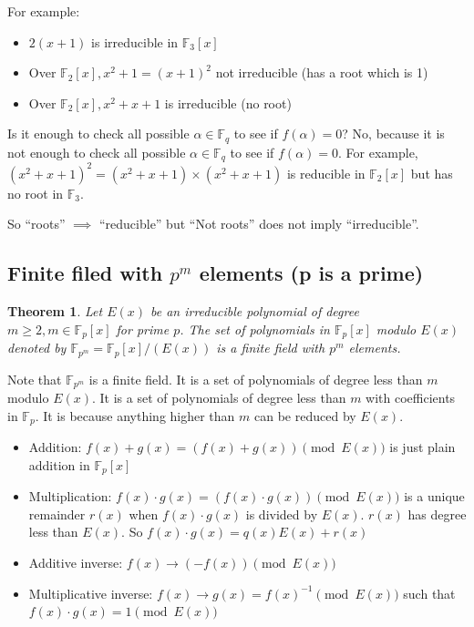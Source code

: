 \documentclass[letterpaper,12pt]{article}
\newtheorem{theorem}{Theorem}
\begin{document}
For example: \begin{itemize}
    \item $2(x+1)$ is irreducible in $\mathbb{F}_3[x]$
    \item Over $\mathbb{F}_2[x],x^2+1=(x+1)^2$ not irreducible (has a root which is 1)
    \item Over $\mathbb{F}_2[x], x^2+x+1$ is irreducible (no root)
\end{itemize}
Is it enough to check all possible $\alpha \in \mathbb{F}_q$ to see if $f(\alpha)=0$? No, because it is not enough to check all possible $\alpha \in \mathbb{F}_q$ to see if $f(\alpha)=0$. For example, $(x^2+x+1)^2 = (x^2+x+1)\times(x^2+x+1)$ is reducible in $\mathbb{F}_2[x]$ but has no root in $\mathbb{F}_3$.

So ``roots'' $\implies$ ``reducible'' but ``Not roots'' does not imply
``irreducible''.
\subsection{Finite filed with $p^m$ elements (p is a prime)}
\begin{theorem}
    Let $E(x)$ be an irreducible polynomial of degree $m\ge 2, m \in \mathbb{F}_p[x]$ for prime $p$. The set of polynomials in $\mathbb{F}_p[x]$ modulo $E(x)$ denoted by $\mathbb{F}_{p^m}= \mathbb{F}_p[x]/(E(x))$ is a finite field with $p^m$ elements.
\end{theorem}
Note that $\mathbb{F}_{p^m}$ is a finite field. It is a set of polynomials of degree less than $m$ modulo $E(x)$. It is a set of polynomials of degree less than $m$ with coefficients in $\mathbb{F}_p$. It is because anything higher than $m$ can be reduced by $E(x)$.

\begin{itemize}
    \item Addition: $f(x)+g(x) = (f(x)+g(x))\pmod {E(x)}$ is just plain addition in
          $\mathbb{F}_p[x]$
    \item Multiplication: $f(x)\cdot g(x) = (f(x)\cdot g(x))\pmod {E(x)}$ is a unique
          remainder $r(x)$ when $f(x)\cdot g(x)$ is divided by $E(x)$. $r(x)$ has degree
          less than $E(x)$. So $f(x)\cdot g(x)=q(x)E(x)+r(x)$
    \item Additive inverse: $f(x) \to (-f(x))\pmod {E(x)}$
    \item Multiplicative inverse: $f(x) \to g(x)=f(x)^{-1}\pmod {E(x)}$ such that
          $f(x)\cdot g(x)=1\pmod {E(x)}$
\end{itemize}
\end{document}
